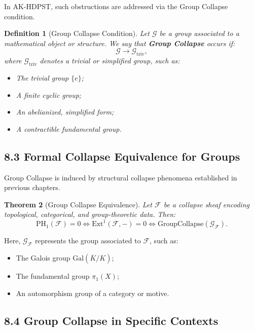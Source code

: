 \documentclass[11pt]{article}
\newtheorem{theorem}{Theorem}[section]
\newtheorem{definition}[theorem]{Definition}
\begin{document}
In AK-HDPST, such obstructions are addressed via the Group Collapse condition.

\begin{definition}[Group Collapse Condition]
Let \( \mathcal{G} \) be a group associated to a mathematical object or structure. We say that \textbf{Group Collapse} occurs if:
\[
\mathcal{G} \longrightarrow \mathcal{G}_{\mathrm{triv}},
\]
where \( \mathcal{G}_{\mathrm{triv}} \) denotes a trivial or simplified group, such as:

\begin{itemize}
    \item The trivial group \( \{e\} \);
    \item A finite cyclic group;
    \item An abelianized, simplified form;
    \item A contractible fundamental group.
\end{itemize}
\end{definition}

\subsection*{8.3 Formal Collapse Equivalence for Groups}

Group Collapse is induced by structural collapse phenomena established in previous chapters.

\begin{theorem}[Group Collapse Equivalence]
Let \( \mathcal{F} \) be a collapse sheaf encoding topological, categorical, and group-theoretic data. Then:
\[
\mathrm{PH}_1(\mathcal{F}) = 0 \iff \mathrm{Ext}^1(\mathcal{F}, -) = 0 \iff \mathrm{GroupCollapse}(\mathcal{G}_{\mathcal{F}}).
\]
\end{theorem}

Here, \( \mathcal{G}_{\mathcal{F}} \) represents the group associated to \( \mathcal{F} \), such as:

\begin{itemize}
    \item The Galois group \( \mathrm{Gal}(\overline{K}/K) \);
    \item The fundamental group \( \pi_1(X) \);
    \item An automorphism group of a category or motive.
\end{itemize}

\subsection*{8.4 Group Collapse in Specific Contexts}
\end{document}
